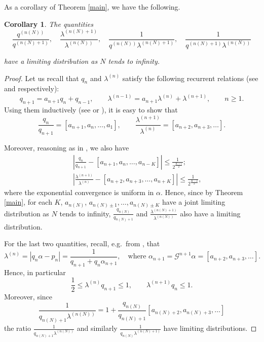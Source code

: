 \documentclass{conm-p-l}
\numberwithin{equation}{section}
\newtheorem{cor}[theorem]{Corollary}
\begin{document}
As a corollary of Theorem \ref{main}, we have the following.
\begin{cor}\label{limitingquantities}
The quantities
\begin{equation*} \frac{q^{(n(N))}}{q^{(n(N)+1)}}, \quad \frac{\lambda^{(n(N)+1)}}{\lambda^{(n(N))}}, \quad \frac{1}{q^{(n(N))}\lambda^{(n(N)+1)}}, \quad \frac{1}{q^{(n(N)+1)}\lambda^{(n(N))}}
\end{equation*}
  
 have a limiting distribution as $N$
tends to infinity.
\end{cor}
\begin{proof}
 Let us recall that $q_n$ and $\lambda^{(n)}$
satisfy the following recurrent relations (see \cite{Kh:con} and \cite{Si:top}
respectively):
\begin{equation}\label{recursiverelations}
q_{n+1}= a_{n+1} q_n + q_{n-1}, \qquad \lambda^{(n-1)}= a_{n+1} \lambda^{(n)} +
\lambda^{(n+1)}, \qquad n\geq 1.
\end{equation}
Using them inductively (see \cite{Kh:con} or \cite{SU:ren}), it is easy to show
that
\begin{equation*}
\frac{q_{n}}{q_{n+1}} = [a_{n+1}, a_{n}, \dots, a_1] , \qquad
\frac{\lambda^{(n+1)}}{\lambda^{(n)}} = [a_{n+2}, a_{n+3}, \dots] .
\end{equation*}

Moreover, reasoning as in \cite{SU:ren}, we also have 
\begin{eqnarray}
&&\left|\frac{q_{n}}{q_{n+1}} - [a_{n+1}, a_{n}, \dots,
a_{n-K}]\right|\leq \frac{1}{{2}^{\frac{K+1}{2}}}; \nonumber \\ && \nonumber \left|
\frac{\lambda^{(n+1)}}{\lambda^{(n)}} - [a_{n+2}, a_{n+3}, \dots, a_{n+K}]
\right| \leq \frac{1}{{2}^{\frac{K-2}{2}}}, \end{eqnarray}
where the
exponential convergence is uniform in $\alpha$. Hence, since by
Theorem \ref{main}, for each $K$,  $a_{n(N)}$,  $a_{n(N)\pm 1},
\dots, a_{n(N)\pm K}$ have a joint limiting distribution as $N$
tends to infinity,
  $\frac{q_{n(N)}}{q_{n(N)+1}}$ and
$\frac{\lambda^{(n(N)+1)}}{\lambda^{(n(N))}}$ also have a limiting
distribution.

For the last two quantities, recall, e.g.~from \cite{Kh:con}, that
\begin{equation*}
\lambda^{(n)} = \left|q_n \alpha  - p_n \right| = \frac{1}{q_{n+1} + q_n
\alpha_{n+1}}, \quad \mathrm{where} \, \,  \alpha_{n+1} = {\mathscr{G}}^{n+1}\alpha = [a_{n+2},
a_{n+3},  \dots ].
\end{equation*}
Hence, in particular 
\begin{equation}\label{towersareas}
 \frac{1}{2} \leq \lambda^{(n)} q_{n+1}  \leq 1, \qquad \lambda^{(n+1)} q_{n}\leq 1.
\end{equation}
Moreover, since
\begin{equation*}
\frac{1}{q_{n(N)+1}\lambda^{(n(N))}} = 1 + \frac{q_{n(N)}}{q_{n(N)+1}}
[a_{n(N)+2}, a_{n(N)+3}, \dots]
\end{equation*}
the ratio
$\frac{1}{q_{n(N)+1}\lambda^{(n(N))}}$ and similarly 
$\frac{1}{q_{n(N)}\lambda^{(n(N)+1)}}$  have limiting distributions.
\end{proof}
\end{document}
